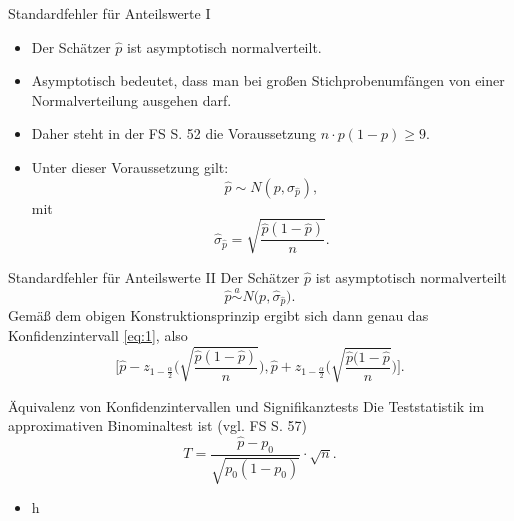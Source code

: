 \documentclass[usenames,dvipsnames,handout]{beamer}
\begin{document}
\begin{frame}{Standardfehler für Anteilswerte I}
\begin{itemize}
\item{Der Schätzer $\hat{p}$ ist asymptotisch normalverteilt.}
\item{Asymptotisch bedeutet,
dass man bei großen Stichprobenumfängen von einer Normalverteilung ausgehen darf.}
\item{Daher steht in der FS S. 52 die Voraussetzung $n \cdot p (1-p) \geq 9.$}
\item{Unter dieser Voraussetzung gilt: $$\hat{p} \sim N (p, \hat{\sigma}_{\hat{p}}),$$
mit $$\hat{\sigma}_{\hat{p}}=\sqrt{\frac{\hat{p}(1-\hat{p})}{n}}.$$}%
\end{itemize}
 
\end{frame}

\begin{frame}{Standardfehler für Anteilswerte II}
Der Schätzer $\hat{p}$ ist asymptotisch normalverteilt
$$
\hat{p} \overset{a}{\sim} N\big(p, \hat{\sigma}_{\hat{p}}\big).
$$
Gemäß dem obigen Konstruktionsprinzip ergibt sich dann genau
das Konfidenzintervall \eqref{eq:1}, also
$$
\bigg[\hat{p} - z_{1-\frac{\alpha}{2}}\Bigg(\sqrt{\frac{\hat{p}(1-\hat{p})}{n}}\Bigg),\hat{p} + z_{1-\frac{\alpha}{2}}\Bigg(\sqrt{\frac{\hat{p}(1-\hat{p}}{n}}\Bigg) \Bigg].
$$
\end{frame}

\begin{frame}{Äquivalenz von Konfidenzintervallen und Signifikanztests}
Die Teststatistik im approximativen Binominaltest ist (vgl. FS S. 57) $$T = \frac{\hat{p}-p_{0}}{\sqrt{p_{0}(1-p_{0})}}\cdot \sqrt{n}. $$%
\begin{itemize}
\item{h}
\end{itemize}
\end{frame}

\end{document}
